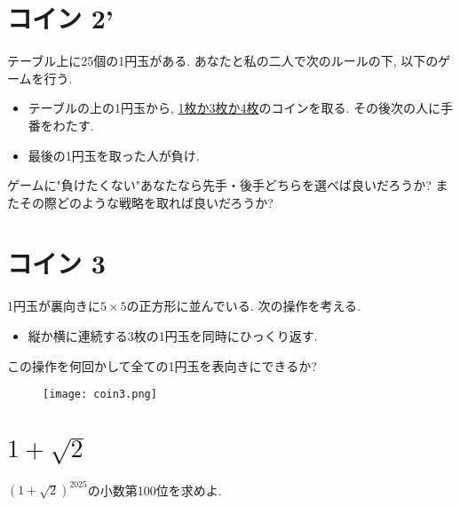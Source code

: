 \documentclass[dvipdfmx,a4paper,12pt]{article} %
\theoremstyle{definition}
\theoremstyle{remark}
\numberwithin{equation}{section}
\begin{document}
\section{コイン 2'}
テーブル上に25個の1円玉がある.
あなたと私の二人で次のルールの下, 以下のゲームを行う.

\begin{itemize}
\item テーブルの上の1円玉から, \underline{1枚か3枚か4枚}のコインを取る. その後次の人に手番をわたす.
\item 最後の1円玉を取った人が負け.
\end{itemize}


ゲームに"負けたくない"あなたなら先手・後手どちらを選べば良いだろうか?
またその際どのような戦略を取れば良いだろうか?

\section{コイン 3}
1円玉が裏向きに$5 \times 5$の正方形に並んでいる.
次の操作を考える. 
\begin{itemize}
\item 縦か横に連続する3枚の1円玉を同時にひっくり返す.
\end{itemize}

 この操作を何回かして全ての1円玉を表向きにできるか?
 
 \begin{figure}[htbp]
\begin{center}
\texttt{[image: coin3.png]}
\end{center}
\end{figure}

\section{$1 + \sqrt{2}$}
$(1 + \sqrt{2})^{2025}$の小数第100位を求めよ.





 
\end{document}
